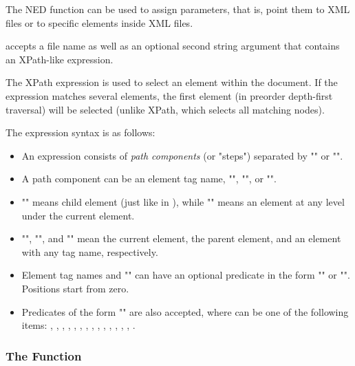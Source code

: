 The  NED function can be used to assign  parameters,
that is, point them to XML files or to specific elements inside XML files.

 accepts a file name as well as an optional second string argument
that contains an XPath-like expression.


The XPath expression is used to select an element within the document. If the
expression matches several elements, the first element (in preorder depth-first
traversal) will be selected (unlike XPath, which selects all matching nodes).

The expression syntax is as follows:
\begin{itemize}
  \item An expression consists of \textit{path components} (or "steps")
    separated by "\ttt{/}" or "\ttt{//}".
  \item A path component can be an element tag name, "\ttt{*}", "", or
    "".
  \item "\ttt{/}" means child element (just like in ), while
    "\ttt{//}" means an element at any level under the current element.
  \item "", "", and "\ttt{*}" mean the current element, the
    parent element, and an element with any tag name, respectively.
  \item Element tag names and "\ttt{*}" can have an optional predicate in the
    form "\ttt{[position]}" or "\ttt{[@attribute='value']}". Positions start
    from zero.
  \item Predicates of the form "\ttt{[@attribute=\textit{\$param}]}" are also
    accepted, where  can be one of the following items:
        ,
        ,
        ,
        ,
        ,
        ,
        ,
        ,
        ,
        ,
        ,
        ,
        ,
        ,
        .
\end{itemize}

\subsubsection{The  Function}
\label{sec:ned-ref:xml-function}

